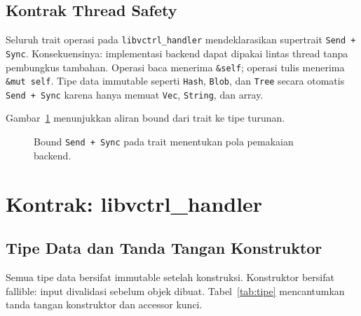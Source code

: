 \documentclass[11pt,a4paper]{article}
\begin{document}
\subsection{Kontrak Thread Safety}

Seluruh trait operasi pada \texttt{libvctrl\_handler} mendeklarasikan supertrait \texttt{Send + Sync}. Konsekuensinya: implementasi backend dapat dipakai lintas thread tanpa pembungkus tambahan. Operasi baca menerima \texttt{\&self}; operasi tulis menerima \texttt{\&mut self}. Tipe data immutable seperti \texttt{Hash}, \texttt{Blob}, dan \texttt{Tree} secara otomatis \texttt{Send + Sync} karena hanya memuat \texttt{Vec}, \texttt{String}, dan array.

Gambar~\ref{fig:thread} menunjukkan aliran bound dari trait ke tipe turunan.

\begin{figure}[H]
	\centering
	\caption{Bound \texttt{Send + Sync} pada trait menentukan pola pemakaian backend.}
	\label{fig:thread}
\end{figure}

\section{Kontrak: libvctrl\_handler}

\subsection{Tipe Data dan Tanda Tangan Konstruktor}

Semua tipe data bersifat immutable setelah konstruksi. Konstruktor bersifat fallible: input divalidasi sebelum objek dibuat. Tabel~\ref{tab:tipe} mencantumkan tanda tangan konstruktor dan accessor kunci.
\end{document}
